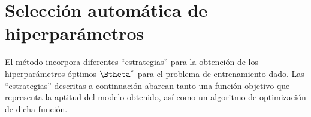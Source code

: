 %
%
%
\section{Selección automática de hiperparámetros}
%
El método incorpora diferentes ``estrategias'' para la obtención de
los hiperparámetros óptimos $\Btheta^*$ para el problema de
entrenamiento dado.  Las ``estrategias'' descritas a continuación
abarcan tanto una \hyperref[funcobjetivo]{función objetivo} que
representa la aptitud del modelo obtenido, así como un algoritmo de
optimización de dicha función.

